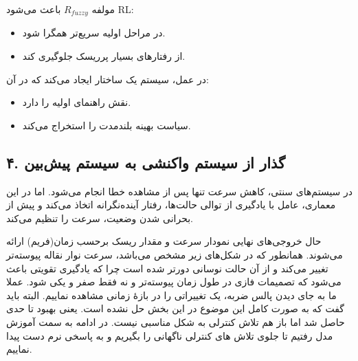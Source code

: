 \documentclass[a4paper, 10pt, twocolumn]{article}
\begin{document}
	مولفه $R_{fuzzy}$ باعث می‌شود RL:
	
	\begin{itemize}
		\item در مراحل اولیه سریع‌تر همگرا شود.
		\item از رفتارهای بسیار پرریسک جلوگیری کند.
	\end{itemize}
	
	در عمل، سیستم یک ساختار  ایجاد می‌کند که در آن:
	
	\begin{itemize}
		\item {} نقش راهنمای اولیه را دارد.
		\item {} سیاست بهینه بلندمدت را استخراج می‌کند.
	\end{itemize}
	
	\vspace{1em}
	
	\subsection{۴. گذار از سیستم واکنشی به سیستم پیش‌بین}
	
	در سیستم‌های سنتی، کاهش سرعت تنها پس از مشاهده خطا انجام می‌شود.  
	اما در این معماری، عامل با یادگیری از توالی حالت‌ها، رفتار آینده‌نگرانه اتخاذ می‌کند و پیش از بحرانی شدن وضعیت، سرعت را تنظیم می‌کند.
	
	حال خروجی‌های نهایی نمودار سرعت و مقدار ریسک برحسب زمان(فریم) ارائه می‌شوند. همانطور که در شکل‌های زیر مشخص می‌باشد، سرعت نوار نقاله پیوسته‌تر تغییر می‌کند و از آن حالت نوسانی دورتر شده است چرا که یادگیری تقویتی باعث می‌شود که تصمیمات فازی در طول زمان پیوسته‌تر و نه فقط صفر و یکی شود. عملا ما به جای دیدن پالس ضربه، یک تغییراتی را در بازۀ زمانی مشاهده نماییم. البته باید گفت که به صورت کامل این موضوع در این بخش حل نشده است. یعنی بهبود تا حدی حاصل شد اما باز هم تلاش کنترلی به شکل مناسبی نیست. در ادامه به سمت آموزش مدل  رفتیم تا جلوی تلاش های کنترلی ناگهانی را بگیریم و به پاسخی نرم دست پیدا نماییم.
	
\end{document}

